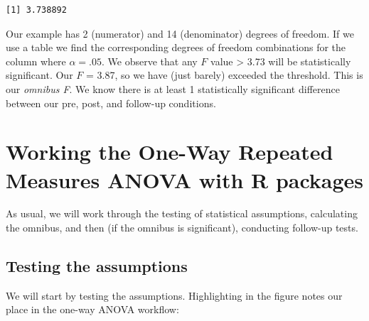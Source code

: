 \documentclass[
  11pt,
]{book}
\begin{document}
\begin{verbatim}
[1] 3.738892
\end{verbatim}

Our example has 2 (numerator) and 14 (denominator) degrees of freedom. If we use a table we find the corresponding degrees of freedom combinations for the column where \(\alpha = .05\). We observe that any \(F\) value \textgreater{} 3.73 will be statistically significant. Our \(F\) = 3.87, so we have (just barely) exceeded the threshold. This is our \emph{omnibus F}. We know there is at least 1 statistically significant difference between our pre, post, and follow-up conditions.

\hypertarget{working-the-one-way-repeated-measures-anova-with-r-packages}{%
\section{Working the One-Way Repeated Measures ANOVA with R packages}\label{working-the-one-way-repeated-measures-anova-with-r-packages}}

As usual, we will work through the testing of statistical assumptions, calculating the omnibus, and then (if the omnibus is significant), conducting follow-up tests.

\hypertarget{testing-the-assumptions}{%
\subsection{Testing the assumptions}\label{testing-the-assumptions}}

We will start by testing the assumptions. Highlighting in the figure notes our place in the one-way ANOVA workflow:
\end{document}
